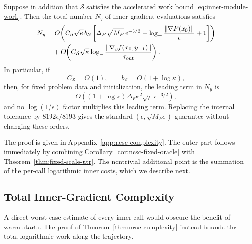 \begin{theorem}
Suppose in addition that $\mathcal S$ satisfies the accelerated
work bound \eqref{eq:inner-module-work}. Then the total number
$N_y$ of inner-gradient evaluations satisfies
\begin{align}
    N_y
    &=
    O\!\left(
        C_{\mathcal S}\sqrt\kappa\,b_{\mathcal S}
        \left[
            \Delta_P\sqrt{M_P}\,
            \epsilon^{-3/2}
            +
            \log_+
            \frac{\|\nabla P(x_0)\|}{\epsilon}
            +1
        \right]
    \right)
    \notag\\
    &\quad+
    O\!\left(
        C_{\mathcal S}\sqrt\kappa
        \log_+
        \frac{
            \|\nabla_yf(x_0,y_{-1})\|
        }{
            \tau_{\rm out}
        }
    \right).
    \label{eq:ncsc-gradient-complexity}
\end{align}
In particular, if
\[
    C_{\mathcal S}=O(1),
    \qquad
    b_{\mathcal S}=O(1+\log\kappa),
\]
then, for fixed problem data and initialization, the leading term in
$N_y$ is
\begin{equation}
    O\!\left(
        (1+\log\kappa)
        \Delta_P\kappa^2\sqrt\rho\,
        \epsilon^{-3/2}
    \right),
    \label{eq:ncsc-gradient-leading}
\end{equation}
and no $\log(1/\epsilon)$ factor multiplies this leading term.
Replacing the internal tolerance by $8192\epsilon/8193$ gives the
standard
$(\epsilon,\sqrt{M_P\epsilon})$ guarantee without changing these
orders.
\end{theorem}

The proof is given in Appendix~\ref{app:ncsc-complexity}.
The outer part follows immediately by combining
Corollary~\ref{cor:ncsc-fixed-oracle} with
Theorem~\ref{thm:fixed-scale-utr}. The nontrivial additional point is
the summation of the per-call logarithmic inner costs, which we
describe next.


\subsection{Total Inner-Gradient Complexity}
\label{sec:known-parameter-inner}

A direct worst-case estimate of every inner call would obscure the
benefit of warm starts. The proof of
Theorem~\ref{thm:ncsc-complexity} instead bounds the total logarithmic
work along the trajectory.


